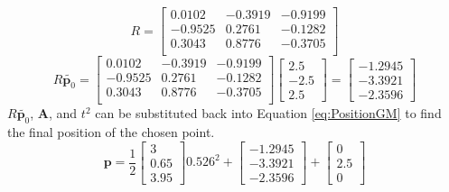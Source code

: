 \begin{equation}\label{ma:Calculated Rotation}
	R = 
		\begin{bmatrix}
		   0.0102 & 
		  -0.3919 & 
		  -0.9199 \\
		  
		  -0.9525 & 
		   0.2761 & 
		  -0.1282 \\
		  
		   0.3043 & 
		   0.8776 & 
		  -0.3705 \\
	\end{bmatrix}
\end{equation}
\begin{equation}\label{ma:CalculatedRPO}
	R\tilde{\mathbf{p}_{0}} =
	\begin{bmatrix}
		  0.0102 & 
		  -0.3919 & 
		  -0.9199 \\
		  
		  -0.9525 & 
		  0.2761 & 
		  -0.1282 \\
		  
		  0.3043 & 
		  0.8776 & 
		  -0.3705 \\
	\end{bmatrix}
	\begin{bmatrix}
		 2.5 \\
		-2.5 	 \\
		 2.5 
	\end{bmatrix}
	= 
	\begin{bmatrix}
		 -1.2945 \\
		 -3.3921 \\
		 -2.3596 
	\end{bmatrix}
\end{equation}
$R\tilde{\mathbf{p}_{0}}$, $\mathbf{A}$, and $t^{2}$ can be substituted back into Equation \ref{eq:PositionGM} to find the final position of the chosen point.
\begin{equation}\label{eq:workout}
	\mathbf{p}=\frac{1}{2}
	\begin{bmatrix}
		 3  \\
		 0.65 \\
		 3.95 
	\end{bmatrix}
	0.526^{2}+
	\begin{bmatrix}
		 -1.2945 \\
		 -3.3921 \\
		 -2.3596 
	\end{bmatrix}
	+
	\begin{bmatrix}
	0 \\
	2.5 \\
	0
	\end{bmatrix}
\end{equation}
